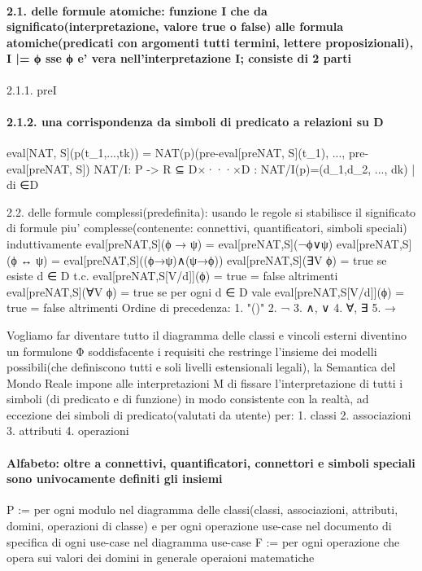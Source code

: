 \documentclass[12pt]{article}
\begin{document}
\paragraph{2.1. delle formule atomiche: funzione I che da significato(interpretazione, valore true o false) alle formula atomiche(predicati con argomenti tutti termini, lettere proposizionali), I |= ϕ sse ϕ e' vera nell'interpretazione I; consiste di 2 parti}
				2.1.1. preI
\paragraph{2.1.2. una corrispondenza da simboli di predicato a relazioni su D}
					eval[NAT, S](p(t_1,...,tk)) = NAT(p)(pre-eval[preNAT, S](t_1), ..., pre-eval[preNAT, S])
					NAT/I: P -> R ⊆ D×···×D : NAT/I(p)={(d_1,d_2, ..., dk) | di ∈D}      

			2.2. delle formule complessi(predefinita): usando le regole si stabilisce il significato di formule piu' complesse(contenente: connettivi, quantificatori, simboli speciali) induttivamente 
				eval[preNAT,S](ϕ → ψ) = eval[preNAT,S](¬ϕ∨ψ)
				eval[preNAT,S](ϕ ↔ ψ) = eval[preNAT,S]((ϕ→ψ)∧(ψ→ϕ))
				eval[preNAT,S](∃V ϕ) = true se esiste d ∈ D t.c. eval[preNAT,S[V/d]](ϕ) = true
					= false altrimenti
				eval[preNAT,S](∀V ϕ) = true se per ogni d ∈ D vale eval[preNAT,S[V/d]](ϕ) = true
					= false altrimenti
				Ordine di precedenza: 1. "()"	2. ¬	3. ∧, ∨	    4. ∀, ∃	5. →

Vogliamo far diventare tutto il diagramma delle classi e vincoli esterni diventino un formulone Φ soddisfacente i requisiti che restringe l'insieme dei modelli possibili(che definiscono tutti e soli livelli estensionali legali), la Semantica del Mondo Reale impone alle interpretazioni M di fissare l’interpretazione di tutti i simboli (di predicato e di funzione) in modo consistente con la realtà, ad eccezione dei simboli di predicato(valutati da utente) per: 1. classi 2. associazioni 3. attributi 4. operazioni

\paragraph{Alfabeto: oltre a connettivi, quantificatori, connettori e simboli speciali sono univocamente definiti gli insiemi}
	P := per ogni modulo nel diagramma delle classi(classi, associazioni, attributi, domini, operazioni di classe) e per ogni operazione use-case nel documento di specifica di ogni use-case nel diagramma use-case
	F := per ogni operazione che opera sui valori dei domini in generale operaioni matematiche 
\end{document}
